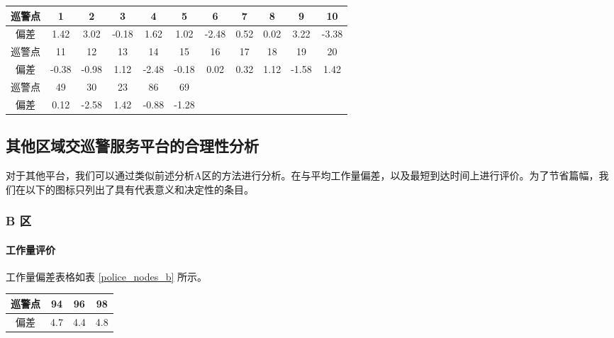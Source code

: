 \documentclass{cumcmthesis}
\begin{document}
    \begin{center}
       \label{police_nodes_2}
      \begin{tabular}{c|cccccccccc}
        \hline
        巡警点 & 1     & 2     & 3     & 4     & 5     & 6     & 7    & 8    & 9     & 10    \\
        \hline
        偏差   & 1.42  & 3.02  & -0.18 & 1.62  & 1.02  & -2.48 & 0.52 & 0.02 & 3.22  & -3.38 \\
        \hline
        巡警点 & 11    & 12    & 13    & 14    & 15    & 16    & 17   & 18   & 19    & 20    \\
        \hline
        偏差   & -0.38 & -0.98 & 1.12  & -2.48 & -0.18 & 0.02  & 0.32 & 1.12 & -1.58 & 1.42  \\
        \hline
        巡警点 & 49    & 30    & 23    & 86    & 69    &       &      &      &       &       \\
        \hline
        偏差   & 0.12  & -2.58 & 1.42  & -0.88 & -1.28 &       &      &      &       &       \\
        \hline
      \end{tabular}
    \end{center}

  \subsection{其他区域交巡警服务平台的合理性分析}

    对于其他平台，我们可以通过类似前述分析A区的方法进行分析。在与平均工作量偏差，以及最短到达时间上进行评价。为了节省篇幅，我们在以下的图标只列出了具有代表意义和决定性的条目。

    \subsubsection{B 区}

      \paragraph{工作量评价}
        工作量偏差表格如表 \ref{police_nodes_b} 所示。

        \begin{center}
           \label{police_nodes_b}
          \begin{tabular}{c|ccc}
            \hline
            巡警点 & 94  & 96  & 98  \\
            \hline
            偏差   & 4.7 & 4.4 & 4.8 \\
            \hline
          \end{tabular}
        \end{center}
\end{document}
